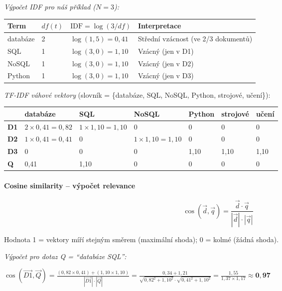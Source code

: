 \textit{Výpočet IDF pro náš příklad ($N = 3$):}
\begin{center}\footnotesize
\begin{tabular}{llll}
\toprule
\textbf{Term} & \textbf{$df(t)$} & \textbf{$\text{IDF} = \log(3/df)$} & \textbf{Interpretace} \\
\midrule
databáze & 2 & $\log(1{,}5) = 0{,}41$ & Střední vzácnost (ve 2/3 dokumentů) \\
SQL      & 1 & $\log(3{,}0) = 1{,}10$ & Vzácný (jen v D1) \\
NoSQL    & 1 & $\log(3{,}0) = 1{,}10$ & Vzácný (jen v D2) \\
Python   & 1 & $\log(3{,}0) = 1{,}10$ & Vzácný (jen v D3) \\
\bottomrule
\end{tabular}
\end{center}

\textit{TF-IDF váhové vektory} (slovník = \{databáze, SQL, NoSQL, Python, strojové, učení\}):
\begin{center}\footnotesize
\begin{tabular}{lllllll}
\toprule
 & databáze & SQL & NoSQL & Python & strojové & učení \\
\midrule
\textbf{D1} & $2 \times 0{,}41 = 0{,}82$ & $1 \times 1{,}10 = 1{,}10$ & 0 & 0 & 0 & 0 \\
\textbf{D2} & $1 \times 0{,}41 = 0{,}41$ & 0 & $1 \times 1{,}10 = 1{,}10$ & 0 & 0 & 0 \\
\textbf{D3} & 0 & 0 & 0 & 1{,}10 & 1{,}10 & 1{,}10 \\
\textbf{Q}  & 0{,}41 & 1{,}10 & 0 & 0 & 0 & 0 \\
\bottomrule
\end{tabular}
\end{center}

\paragraph{Cosine similarity -- výpočet relevance}
$$\cos(\vec{d}, \vec{q}) = \frac{\vec{d} \cdot \vec{q}}{|\vec{d}| \cdot |\vec{q}|}$$

Hodnota 1 = vektory míří stejným směrem (maximální shoda); 0 = kolmé (žádná shoda).

\textit{Výpočet pro dotaz Q = ``databáze SQL'':}

$\cos(\vec{D1}, \vec{Q}) = \frac{(0{,}82 \times 0{,}41) + (1{,}10 \times 1{,}10)}{|\vec{D1}| \cdot |\vec{Q}|}
= \frac{0{,}34 + 1{,}21}{\sqrt{0{,}82^2+1{,}10^2} \cdot \sqrt{0{,}41^2+1{,}10^2}}
= \frac{1{,}55}{1{,}37 \times 1{,}17} \approx \mathbf{0{,}97}$

